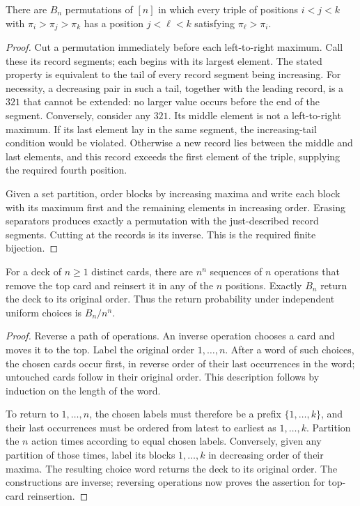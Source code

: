 \begin{proposition}
\label{prop:barred-pattern}
There are $B_n$ permutations of $[n]$ in which every triple of positions
$i<j<k$ with $\pi_i>\pi_j>\pi_k$ has a position $j<\ell<k$ satisfying
$\pi_\ell>\pi_i$.
\end{proposition}
\begin{proof}
Cut a permutation immediately before each left-to-right maximum. Call these
its record segments; each begins with its largest element. The stated
property is equivalent to the tail of every record segment being increasing.
For necessity, a decreasing pair in such a tail, together with the leading
record, is a $321$ that cannot be extended: no larger value occurs before
the end of the segment. Conversely, consider any $321$. Its middle element
is not a left-to-right maximum. If its last element lay in the same segment,
the increasing-tail condition would be violated. Otherwise a new record lies
between the middle and last elements, and this record exceeds the first
element of the triple, supplying the required fourth position.

Given a set partition, order blocks by increasing maxima and write each block
with its maximum first and the remaining elements in increasing order.
Erasing separators produces exactly a permutation with the just-described
record segments. Cutting at the records is its inverse. This is the required
finite bijection.
\end{proof}

\begin{proposition}\label{prop:return-shuffles}
For a deck of $n\geq1$ distinct cards, there are $n^n$ sequences of $n$
operations that remove the top card and reinsert it in any of the $n$
positions. Exactly $B_n$ return the deck to its original order. Thus the
return probability under independent uniform choices is $B_n/n^n$.
\end{proposition}
\begin{proof}
Reverse a path of operations. An inverse operation chooses a card and moves
it to the top. Label the original order $1,\ldots,n$. After a word of such
choices, the chosen cards occur first, in reverse order of their last
occurrences in the word; untouched cards follow in their original order.
This description follows by induction on the length of the word.

To return to $1,\ldots,n$, the chosen labels must therefore be a prefix
$\{1,\ldots,k\}$, and their last occurrences must be ordered from latest to
earliest as $1,\ldots,k$. Partition the $n$ action times according to equal
chosen labels. Conversely, given any partition of those times, label its
blocks $1,\ldots,k$ in decreasing order of their maxima. The resulting choice
word returns the deck to its original order. The constructions are inverse;
reversing operations now proves the assertion for top-card reinsertion.
\end{proof}

